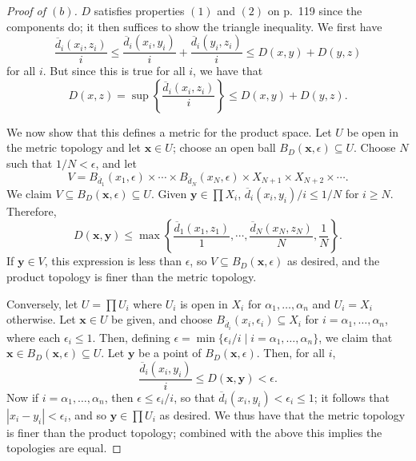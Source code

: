 \documentclass[12pt]{article}
\theoremstyle{remark}
\begin{document}
\begin{proof}[Proof of $(b)$]
  $D$ satisfies properties $(1)$ and $(2)$ on p.~119 since the components do; it then suffices to show the triangle inequality. We first have
  \begin{equation*}
    \frac{\overline{d}_i(x_i,z_i)}{i} \le \frac{\overline{d}_i(x_i,y_i)}{i} + \frac{\overline{d}_i(y_i,z_i)}{i} \le D(x,y) + D(y,z)
  \end{equation*}
  for all $i$. But since this is true for all $i$, we have that
  \begin{equation*}
    D(x,z) = \sup\left\{\frac{\overline{d}_i(x_i,z_i)}{i}\right\} \le D(x,y) + D(y,z).
  \end{equation*}
  \par We now show that this defines a metric for the product space. Let $U$ be open in the metric topology and let $\mathbf{x} \in U$; choose an open ball $B_D(\mathbf{x},\epsilon) \subseteq U$. Choose $N$ such that $1/N < \epsilon$, and let
  \begin{equation*}
    V = B_{\overline{d}_1}(x_1,\epsilon) \times \cdots \times B_{\overline{d}_N}(x_N,\epsilon) \times X_{N+1} \times X_{N+2} \times \cdots.
  \end{equation*}
  We claim $V \subseteq B_D(\mathbf{x},\epsilon) \subseteq U$. Given $\mathbf{y} \in \prod X_i$, $\overline{d}_i(x_i,y_i)/i \le 1/N$ for $i \ge N$. Therefore,
  \begin{equation*}
    D(\mathbf{x},\mathbf{y}) \le \max\left\{ \frac{\overline{d}_1(x_1,z_1)}{1}, \cdots, \frac{\overline{d}_N(x_N,z_N)}{N}, \frac{1}{N} \right\}.
  \end{equation*}
  If $\mathbf{y} \in V$, this expression is less than $\epsilon$, so $V \subseteq B_D(\mathbf{x},\epsilon)$ as desired, and the product topology is finer than the metric topology.
  \par Conversely, let $U = \prod U_i$ where $U_i$ is open in $X_i$ for
  $\alpha_1,\ldots,\alpha_n$ and $U_i = X_i$ otherwise. Let $\mathbf{x} \in U$
  be given, and choose $B_{\overline{d}_i}(x_i,\epsilon_i) \subseteq X_i$ for $i
  = \alpha_1,\ldots,\alpha_n$, where each $\epsilon_i \le 1$. Then, defining
  $\epsilon = \min\{\epsilon_i/i \mid i = \alpha_1,\ldots,\alpha_n\}$, we claim that $\mathbf{x} \in B_D(\mathbf{x},\epsilon) \subseteq U$. Let $\mathbf{y}$ be a point of $B_D(\mathbf{x},\epsilon)$. Then, for all $i$,
  \begin{equation*}
    \frac{\overline{d}_i(x_i,y_i)}{i} \le D(\mathbf{x},\mathbf{y}) < \epsilon.
  \end{equation*}
  Now if $i = \alpha_1,\ldots,\alpha_n$, then $\epsilon \le \epsilon_i/i$, so that $\overline{d}_i(x_i,y_i) < \epsilon_i \le 1$; it follows that $|x_i-y_i| < \epsilon_i$, and so $\mathbf{y} \in \prod U_i$ as desired. We thus have that the metric topology is finer than the product topology; combined with the above this implies the topologies are equal.
\end{proof}
\end{document}
